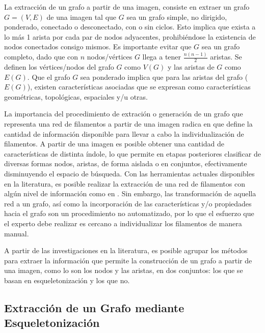 La extracci\'on de un grafo a partir de una imagen, consiste en extraer un grafo $G = (V,E)$ de una imagen tal que $G$ sea un grafo simple, no dirigido, ponderado, conectado o desconectado, con o sin ciclos. Esto implica que exista a lo m\'as 1 arista por cada par de nodos adyacentes, prohibi\'endose la existencia de nodos conectados consigo mismos. Es importante evitar que $G$ sea un grafo completo, dado que con $n$ nodos/v\'ertices $G$ llega a tener $\frac{n(n-1)}{2}$ aristas.
Se definen los v\'ertices/nodos del grafo $G$ como $V(G)$ y las aristas de $G$ como $E(G)$. 
Que el grafo $G$ sea ponderado implica que para las aristas del grafo ($E(G)$), existen caracter\'isticas asociadas que se expresan como caracter\'isticas geom\'etricas, topol\'ogicas, espaciales y/u otras.


La importancia del procedimiento de extraci\'on o generaci\'on de un grafo que representa una red de filamentos a partir de una imagen radica en que define la cantidad de informaci\'on disponible para llevar a cabo la individualizaci\'on de filamentos. A partir de una imagen es posible obtener una cantidad de caracter\'isticas de distinta \'indole, lo que permite en etapas posteriores clasificar de diversas formas nodos, aristas, de forma aislada o en conjuntos, efectivamente disminuyendo el espacio de b\'usqueda. Con las herramientas actuales disponibles en la literatura, es posible realizar la extracci\'on de una red de filamentos con algún nivel de informaci\'on como en \citet{xu2015soax}. Sin embargo, las transformaci\'on de aquella red a un grafo, as\'i como la incorporaci\'on de las caracter\'isticas y/o propiedades hacia el grafo son un procedimiento no automatizado, por lo que el esfuerzo que el experto debe realizar es cercano a individualizar los filamentos de manera manual.

A partir de las investigaciones en la literatura, es posible agrupar los m\'etodos para extraer la informaci\'on que permite la construcci\'on de un grafo a partir de una imagen, como lo son los nodos y las aristas, en dos conjuntos: los que se basan en esqueletonizaci\'on \citep[ver][]{lavado2018comparacion} y los que no. 

\subsection{Extracci\'on de un Grafo mediante Esqueletonizaci\'on}
\label{subsec:infoLossSkel}

